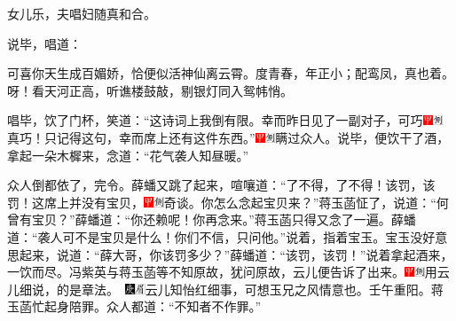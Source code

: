 女儿乐，夫唱妇随真和合。

说毕，唱道：

可喜你天生成百媚娇，恰便似活神仙离云霄。度青春，年正小；配鸾凤，真也着。呀！看天河正高，听谯楼鼓敲，剔银灯同入鸳帏悄。

唱毕，饮了门杯，笑道：``这诗词上我倒有限。幸而昨日见了一副对子，可巧{\includegraphics[width=3mm]{../Images/00002}\includegraphics[width=3mm]{../Images/00011}\footnotesize \kaishu 真巧！}只记得这句，幸而席上还有这件东西。''{\includegraphics[width=3mm]{../Images/00002}\includegraphics[width=3mm]{../Images/00011}\footnotesize \kaishu 瞒过众人。}说毕，便饮干了酒，拿起一朵木樨来，念道：``花气袭人知昼暖。''

众人倒都依了，完令。薛蟠又跳了起来，喧嚷道：``了不得，了不得！该罚，该罚！这席上并没有宝贝，{\includegraphics[width=3mm]{../Images/00002}\includegraphics[width=3mm]{../Images/00011}\footnotesize \kaishu 奇谈。}你怎么念起宝贝来？''蒋玉菡怔了，说道：``何曾有宝贝？''薛蟠道：``你还赖呢！你再念来。''蒋玉菡只得又念了一遍。薛蟠道：``袭人可不是宝贝是什么！你们不信，只问他。''说着，指着宝玉。宝玉没好意思起来，说道：``薛大哥，你该罚多少？''薛蟠道：``该罚，该罚！''说着拿起酒来，一饮而尽。冯紫英与蒋玉菡等不知原故，犹问原故，云儿便告诉了出来。{\includegraphics[width=3mm]{../Images/00002}\includegraphics[width=3mm]{../Images/00011}\footnotesize \kaishu 用云儿细说，的是章法。　\includegraphics[width=3mm]{../Images/00004}\includegraphics[width=3mm]{../Images/00010}\footnotesize \kaishu 云儿知怡红细事，可想玉兄之风情意也。壬午重阳。}蒋玉菡忙起身陪罪。众人都道：``不知者不作罪。''


